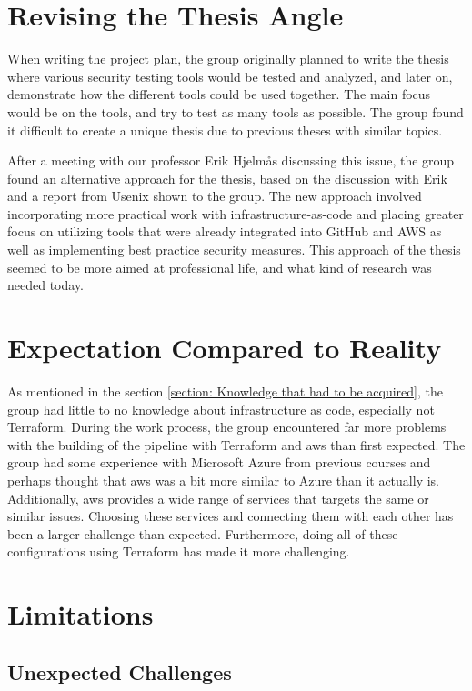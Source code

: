 \section{Revising the Thesis Angle}
When writing the project plan, the group originally planned to write the thesis where various security testing tools would be tested and analyzed, and later on, demonstrate how the different tools could be used together. The main focus would be on the tools, and try to test as many tools as possible. The group found it difficult to create a unique thesis due to previous theses with similar topics. 

After a meeting with our professor Erik Hjelmås discussing this issue, the group found an alternative approach for the thesis, based on the discussion with Erik and a report from Usenix \cite{usenixreport} shown to the group. The new approach involved incorporating more practical work with infrastructure-as-code and placing greater focus on utilizing tools that were already integrated into GitHub and AWS as well as implementing best practice security measures. This approach of the thesis seemed to be more aimed at professional life, and what kind of research was needed today.  


\section{Expectation Compared to Reality}
As mentioned in the section \ref{section: Knowledge that had to be acquired}, the group had little to no knowledge about \gls{infrastructure as code}, especially not Terraform. During the work process, the group encountered far more problems with the building of the pipeline with Terraform and \acrshort{aws} than first expected. The group had some experience with Microsoft Azure from previous courses and perhaps thought that \acrshort{aws} was a bit more similar to Azure than it actually is. Additionally, \acrshort{aws} provides a wide range of services that targets the same or similar issues. Choosing these services and connecting them with each other has been a larger challenge than expected. Furthermore, doing all of these configurations using Terraform has made it more challenging.


\section{Limitations}
\subsection{Unexpected Challenges}


